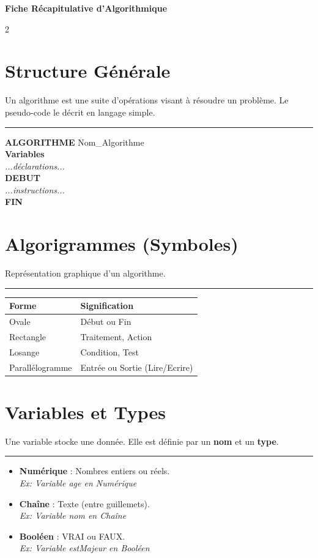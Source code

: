 \documentclass[10pt,a4paper]{article}
\begin{document}
\begin{center}
    \huge\textbf{Fiche Récapitulative d'Algorithmique}
\end{center}
\vspace{0.4cm}

\begin{multicols}{2}

\section*{Structure Générale}
Un algorithme est une suite d'opérations visant à résoudre un problème. Le pseudo-code le décrit en langage simple.
\hrule
\vspace{1mm}
\textbf{ALGORITHME} Nom\_Algorithme \\
\textbf{Variables} \\
\quad \textit{...déclarations...} \\
\textbf{DEBUT} \\
\quad \textit{...instructions...} \\
\textbf{FIN}

\section*{Algorigrammes (Symboles)}
Représentation graphique d'un algorithme.
\hrule
\vspace{1mm}
\begin{tabular}{ll}
    \textbf{Forme} & \textbf{Signification} \\
    \hline
    Ovale & Début ou Fin \\
    Rectangle & Traitement, Action \\
    Losange & Condition, Test \\
    Parallélogramme & Entrée ou Sortie (Lire/Ecrire) \\
    \hline
\end{tabular}

\section*{Variables et Types}
Une variable stocke une donnée. Elle est définie par un \textbf{nom} et un \textbf{type}.
\hrule
\begin{itemize}
    \item \textbf{Numérique} : Nombres entiers ou réels. \\ \textit{Ex: Variable age en Numérique}
    \item \textbf{Chaîne} : Texte (entre guillemets). \\ \textit{Ex: Variable nom en Chaîne}
    \item \textbf{Booléen} : VRAI ou FAUX. \\ \textit{Ex: Variable estMajeur en Booléen}
\end{itemize}


\end{multicols}
\end{document}
